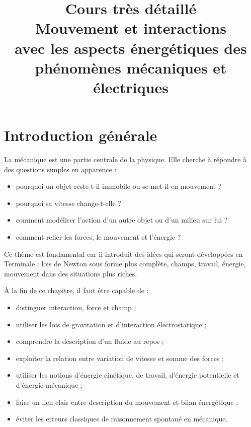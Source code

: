 \documentclass[11pt,a4paper]{article}
\title{\Huge Cours très détaillé\\[0.3em]
\LARGE Mouvement et interactions\\
\Large avec les aspects énergétiques des phénomènes mécaniques et électriques}
\author{}
\date{}
\begin{document}
\maketitle
\tableofcontents
\newpage

\section*{Introduction générale}

La mécanique est une partie centrale de la physique. Elle cherche à répondre à des questions simples en apparence :

\begin{itemize}
    \item pourquoi un objet reste-t-il immobile ou se met-il en mouvement ?
    \item pourquoi sa vitesse change-t-elle ?
    \item comment modéliser l'action d'un autre objet ou d'un milieu sur lui ?
    \item comment relier les forces, le mouvement et l'énergie ?
\end{itemize}

Ce thème est fondamental car il introduit des idées qui seront développées en Terminale : lois de Newton sous forme plus complète, champs, travail, énergie, mouvement dans des situations plus riches.

\begin{objectifbox}
À la fin de ce chapitre, il faut être capable de :
\begin{itemize}
    \item distinguer interaction, force et champ ;
    \item utiliser les lois de gravitation et d'interaction électrostatique ;
    \item comprendre la description d'un fluide au repos ;
    \item exploiter la relation entre variation de vitesse et somme des forces ;
    \item utiliser les notions d'énergie cinétique, de travail, d'énergie potentielle et d'énergie mécanique ;
    \item faire un lien clair entre description du mouvement et bilan énergétique ;
    \item éviter les erreurs classiques de raisonnement spontané en mécanique.
\end{itemize}
\end{objectifbox}
\end{document}
